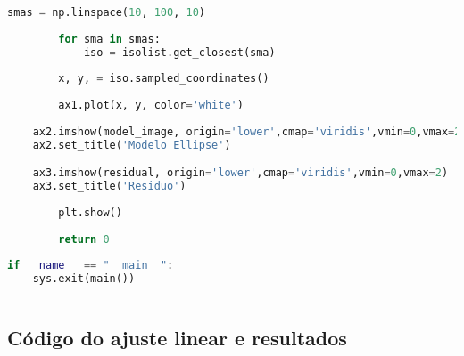 \documentclass[a4paper, 11pt, fleqn, leqno]{article}
\begin{document}
{\begin{lstlisting}[language=Python]
    	smas = np.linspace(10, 100, 10)
    
    	for sma in smas:
    		iso = isolist.get_closest(sma)
        
        x, y, = iso.sampled_coordinates()
        
        ax1.plot(x, y, color='white')
    
    ax2.imshow(model_image, origin='lower',cmap='viridis',vmin=0,vmax=2)
    ax2.set_title('Modelo Ellipse')

	ax3.imshow(residual, origin='lower',cmap='viridis',vmin=0,vmax=2)
	ax3.set_title('Residuo')
    
    	plt.show()
    
    	return 0
    	
if __name__ == "__main__":
    sys.exit(main())
    
\end{lstlisting}
}

\newpage
\subsection{Código do ajuste linear e resultados}
\end{document}

